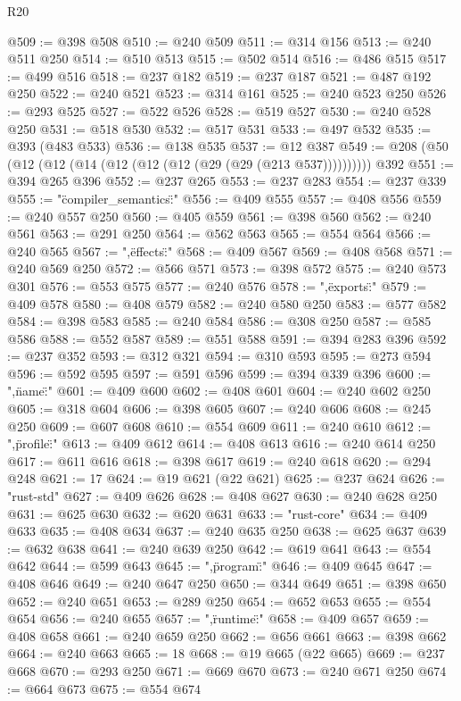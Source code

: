 \begin{lexlean}{R20}
\begin{coremodule}
@509 := @398 @508
@510 := @240 @509
@511 := @314 @156
@513 := @240 @511 @250
@514 := @510 @513
@515 := @502 @514
@516 := @486 @515
@517 := @499 @516
@518 := @237 @182
@519 := @237 @187
@521 := @487 @192 @250
@522 := @240 @521
@523 := @314 @161
@525 := @240 @523 @250
@526 := @293 @525
@527 := @522 @526
@528 := @519 @527
@530 := @240 @528 @250
@531 := @518 @530
@532 := @517 @531
@533 := @497 @532
@535 := @393 (@483 @533)
@536 := @138 @535
@537 := @12 @387
@549 := @208 (@50 (@12 (@12 (@14 (@12 (@12 (@12 (@29 (@29 (@213 @537)))))))))) @392
@551 := @394 @265 @396
@552 := @237 @265
@553 := @237 @283
@554 := @237 @339
@555 := "{\"compiler_semantics\":"
@556 := @409 @555
@557 := @408 @556
@559 := @240 @557 @250
@560 := @405 @559
@561 := @398 @560
@562 := @240 @561
@563 := @291 @250
@564 := @562 @563
@565 := @554 @564
@566 := @240 @565
@567 := ",\"effects\":"
@568 := @409 @567
@569 := @408 @568
@571 := @240 @569 @250
@572 := @566 @571
@573 := @398 @572
@575 := @240 @573 @301
@576 := @553 @575
@577 := @240 @576
@578 := ",\"exports\":"
@579 := @409 @578
@580 := @408 @579
@582 := @240 @580 @250
@583 := @577 @582
@584 := @398 @583
@585 := @240 @584
@586 := @308 @250
@587 := @585 @586
@588 := @552 @587
@589 := @551 @588
@591 := @394 @283 @396
@592 := @237 @352
@593 := @312 @321
@594 := @310 @593
@595 := @273 @594
@596 := @592 @595
@597 := @591 @596
@599 := @394 @339 @396
@600 := ",\"name\":"
@601 := @409 @600
@602 := @408 @601
@604 := @240 @602 @250
@605 := @318 @604
@606 := @398 @605
@607 := @240 @606
@608 := @245 @250
@609 := @607 @608
@610 := @554 @609
@611 := @240 @610
@612 := ",\"profile\":"
@613 := @409 @612
@614 := @408 @613
@616 := @240 @614 @250
@617 := @611 @616
@618 := @398 @617
@619 := @240 @618
@620 := @294 @248
@621 := 17
@624 := @19 @621 (@22 @621)
@625 := @237 @624
@626 := "rust-std"
@627 := @409 @626
@628 := @408 @627
@630 := @240 @628 @250
@631 := @625 @630
@632 := @620 @631
@633 := "rust-core"
@634 := @409 @633
@635 := @408 @634
@637 := @240 @635 @250
@638 := @625 @637
@639 := @632 @638
@641 := @240 @639 @250
@642 := @619 @641
@643 := @554 @642
@644 := @599 @643
@645 := ",\"program\":"
@646 := @409 @645
@647 := @408 @646
@649 := @240 @647 @250
@650 := @344 @649
@651 := @398 @650
@652 := @240 @651
@653 := @289 @250
@654 := @652 @653
@655 := @554 @654
@656 := @240 @655
@657 := ",\"runtime\":"
@658 := @409 @657
@659 := @408 @658
@661 := @240 @659 @250
@662 := @656 @661
@663 := @398 @662
@664 := @240 @663
@665 := 18
@668 := @19 @665 (@22 @665)
@669 := @237 @668
@670 := @293 @250
@671 := @669 @670
@673 := @240 @671 @250
@674 := @664 @673
@675 := @554 @674
}
\end{coremodule}
\end{lexlean}
